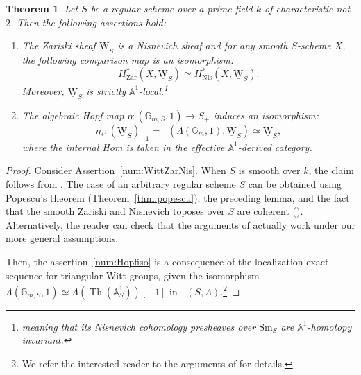 \documentclass[11pt]{article}
\numberwithin{equation}{section}\renewcommand{\encodingdefault}{TU}
\renewcommand{\AA}{\mathbb A}
\newcommand{\uW}{\underline{\mathrm W}}
\newcommand{\eff}{\mathrm{eff}}
\newcommand{\sm}{\mathrm{Sm}}
\DeclareMathOperator{\DAeff}{D_{\AA^1}^{\eff}}
\DeclareMathOperator{\uHom}{\underline{Hom}}
\DeclareMathOperator{\Th}{Th}
\newcommand{\GG} {\mathbb{G}_m}
\newcommand{\GGx}[1] {\mathbb{G}_{m,#1}}
\newcommand{\nis}{\mathrm{Nis}}
\newcommand{\zar}{\mathrm{Zar}}
\newtheorem{thm}{Theorem}[section]
\theoremstyle{remark}
\theoremstyle{definition}
\numberwithin{equation}{thm}
\begin{document}
\begin{thm}\label{thm:representability_Witt}
Let $S$ be a regular scheme over a prime field $k$ of characteristic not~$2$.
Then the following assertions hold:
\begin{enumerate}
\item
\label{num:WittZarNis}
The Zariski sheaf $\uW_S$ is a Nisnevich sheaf and for any smooth $S$-scheme $X$,
the following comparison map is an isomorphism:
\begin{equation}
H^*_\zar(X,\uW_S) \simeq H^*_\nis(X,\uW_S).
\end{equation}
Moreover, $\uW_S$ is strictly $\AA^1$-local.\footnote{meaning that
its Nisnevich cohomology presheaves over $\sm_S$ are $\AA^1$-homotopy invariant.}
\item
\label{num:Hopfiso}
The algebraic Hopf map $\eta:(\GGx S,1) \to S_+$
induces an isomorphism:
\begin{equation}
\label{eq:Witt_Susp}
\eta_*:(\uW_S)_{-1}=\uHom(\Lambda(\GG,1),\uW_S) \simeq \uW_S,
\end{equation}
where the internal Hom is taken in the effective $\AA^1$-derived category.
\end{enumerate}
\end{thm}
\begin{proof}
Consider Assertion~\eqref{num:WittZarNis}.
When $S$ is smooth over $k$, the claim follows from \cite{Panin}.
The case of an arbitrary regular scheme $S$
can be obtained using Popescu's theorem (Theorem~\ref{thm:popescu}), the preceding lemma, and the fact that the smooth Zariski and Nisnevich toposes over $S$ are coherent (\cite[Exp.\,VI, 2.3]{SGA4}).
Alternatively, the reader can check that the arguments of \cite{Panin} actually work under our more general assumptions.

Then, the assertion~\eqref{num:Hopfiso} is a consequence of the localization exact sequence for triangular Witt groups,
given the isomorphism $\Lambda(\GGx S,1) \simeq \Lambda(\Th(\AA^1_S))[-1]$
in $\DAeff(S,\Lambda)$.\footnote{We refer the interested
reader to the arguments of \cite[Lem.\,3.8]{CF1} for details.}
\end{proof}
\end{document}
